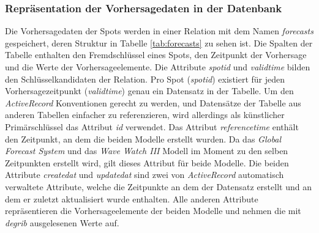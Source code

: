 \subsubsection{Repräsentation der Vorhersagedaten in der Datenbank}
Die Vorhersagedaten der Spots werden in einer Relation mit dem Namen
\textit{forecasts} gespeichert, deren Struktur in Tabelle
\ref{tab:forecasts} zu sehen ist. Die Spalten der Tabelle enthalten
den Fremdschlüssel eines Spots, den Zeitpunkt der Vorhersage und die
Werte der Vorhersageelemente. Die Attribute
\textit{spot\textunderscore id} und \textit{valid\textunderscore time}
bilden den Schlüsselkandidaten der Relation. Pro Spot
(\textit{spot\textunderscore id}) existiert für jeden
Vorhersagezeitpunkt (\textit{valid\textunderscore time}) genau ein
Datensatz in der Tabelle. Um den \textit{ActiveRecord} Konventionen
gerecht zu werden, und Datensätze der Tabelle aus anderen Tabellen
einfacher zu referenzieren, wird allerdings als künstlicher
Primärschlüssel das Attribut \textit{id} verwendet. Das Attribut
\textit{reference\textunderscore time} enthält den Zeitpunkt, an dem
die beiden Modelle erstellt wurden. Da das \textit{Global Forecast
  System} und das \textit{Wave Watch III} Modell im Moment zu den
selben Zeitpunkten erstellt wird, gilt dieses Attribut für beide
Modelle. Die beiden Attribute \textit{created\textunderscore at} und
\textit{updated\textunderscore at} sind zwei von \textit{ActiveRecord}
automatisch verwaltete Attribute, welche die Zeitpunkte an dem der
Datensatz erstellt und an dem er zuletzt aktualisiert wurde
enthalten. Alle anderen Attribute repräsentieren die
Vorhersageelemente der beiden Modelle und nehmen die mit
\textit{degrib} ausgelesenen Werte auf.

